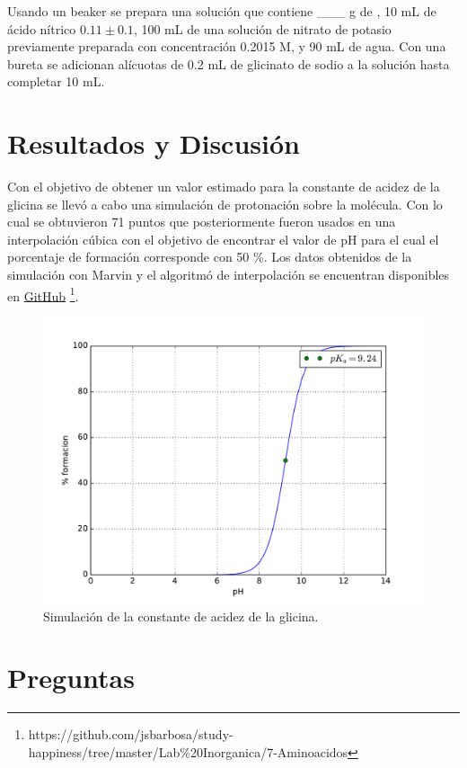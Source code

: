 \documentclass[fleqn,10pt]{SelfArx} %
\begin{document}
	Usando un beaker se prepara una soluci\'on que contiene \_\_\_ g de , 10 mL de \'acido n\'itrico $0.11\pm0.1$, 100 mL de una soluci\'on de nitrato de potasio previamente preparada con concentraci\'on 0.2015 M, y 90 mL de agua. Con una bureta se adicionan al\'icuotas de 0.2 mL de glicinato de sodio a la soluci\'on hasta completar 10 mL.
	
	\section{Resultados y Discusi\'on}
	Con el objetivo de obtener un valor estimado para la constante de acidez de la glicina se llev\'o a cabo una simulaci\'on de protonaci\'on sobre la mol\'ecula. Con lo cual se obtuvieron 71 puntos que posteriormente fueron usados en una interpolaci\'on c\'ubica con el objetivo de encontrar el valor de pH para el cual el porcentaje de formaci\'on corresponde con 50 \%. Los datos obtenidos de la simulaci\'on con Marvin y el algoritm\'o de interpolaci\'on se encuentran disponibles en \href{https://github.com/jsbarbosa/study-happiness/tree/master/Lab\%20Inorganica/7-Aminoacidos}{\color{blue}GitHub} \footnote{https://github.com/jsbarbosa/study- happiness/tree/master/Lab\%20Inorganica/7-Aminoacidos}.
	\begin{figure}[h]
		\centering
		\includegraphics[width=\linewidth]{images/pka_sim.pdf}
		\caption{Simulaci\'on de la constante de acidez de la glicina.}
	\end{figure}
	
	\section{Preguntas}
\end{document}
